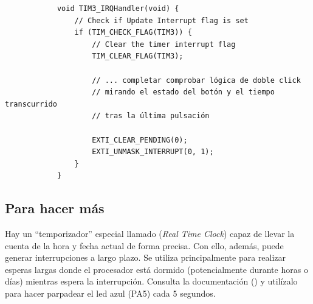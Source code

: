 \documentclass[../main.tex]{subfiles}
\begin{document}
        \begin{lstlisting}
            void TIM3_IRQHandler(void) {
                // Check if Update Interrupt flag is set
                if (TIM_CHECK_FLAG(TIM3)) {
                    // Clear the timer interrupt flag
                    TIM_CLEAR_FLAG(TIM3);

                    // ... completar comprobar lógica de doble click
                    // mirando el estado del botón y el tiempo transcurrido
                    // tras la última pulsación
                    
                    EXTI_CLEAR_PENDING(0);
                    EXTI_UNMASK_INTERRUPT(0, 1);
                }
            }
        \end{lstlisting}

    
    \subsection{Para hacer más}
        Hay un ``temporizador'' especial llamado  (\emph{Real Time Clock}) capaz de llevar la cuenta de la hora y fecha actual de forma precisa. Con ello, además, puede generar interrupciones a largo plazo. Se utiliza principalmente para realizar esperas largas donde el procesador está dormido (potencialmente durante horas o días) mientras espera la interrupción. Consulta la documentación (\REFMAN[25]) y utilízalo para hacer parpadear el led azul (PA5) cada 5 segundos.
\end{document}
